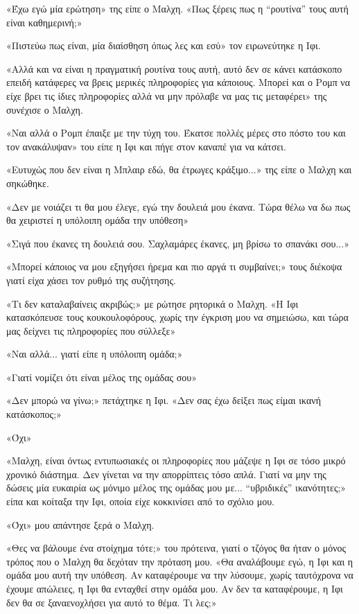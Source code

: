 \documentclass[12pt,twoside, openany]{book}
\begin{document}
«Έχω εγώ μία ερώτηση» της είπε ο Μαλχη. «Πως ξέρεις πως η “ρουτίνα” τους αυτή είναι καθημερινή;»

«Πιστεύω πως είναι, μία διαίσθηση όπως λες και εσύ» τον ειρωνεύτηκε η Ιφι.

«Αλλά και να είναι η πραγματική ρουτίνα τους αυτή, αυτό δεν σε κάνει κατάσκοπο επειδή κατάφερες να βρεις μερικές πληροφορίες για κάποιους. Μπορεί και ο Ρομπ να είχε βρει τις ίδιες πληροφορίες αλλά να μην πρόλαβε να μας τις μεταφέρει» της συνέχισε ο Μαλχη.

«Ναι αλλά ο Ρομπ έπαιξε με την τύχη του. Έκατσε πολλές μέρες στο πόστο του και τον ανακάλυψαν» του είπε η Ιφι και πήγε στον καναπέ για να κάτσει.

«Ευτυχώς που δεν είναι η Μπλαιρ εδώ, θα έτρωγες κράξιμο...» της είπε ο Μαλχη και σηκώθηκε.

«Δεν με νοιάζει τι θα μου έλεγε, εγώ την δουλειά μου έκανα. Τώρα θέλω να δω πως θα χειριστεί η υπόλοιπη ομάδα την υπόθεση»

«Σιγά που έκανες τη δουλειά σου. Σαχλαμάρες έκανες, μη βρίσω το σπανάκι σου...»

«Μπορεί κάποιος να μου εξηγήσει ήρεμα και πιο αργά τι συμβαίνει;» τους διέκοψα γιατί είχα χάσει τον ρυθμό της συζήτησης.

«Τι δεν καταλαβαίνεις ακριβώς;» με ρώτησε ρητορικά ο Μαλχη. «Η Ιφι κατασκόπευσε τους κουκουλοφόρους, χωρίς την έγκριση μου να σημειώσω, και τώρα μας δείχνει τις πληροφορίες που σύλλεξε»

«Ναι αλλά... γιατί είπε η υπόλοιπη ομάδα;»

«Γιατί νομίζει ότι είναι μέλος της ομάδας σου»

«Δεν μπορώ να γίνω;» πετάχτηκε η Ιφι. «Δεν σας έχω δείξει πως είμαι ικανή κατάσκοπος;»

«Όχι»

«Μαλχη, είναι όντως εντυπωσιακές οι πληροφορίες που μάζεψε η Ιφι σε τόσο μικρό χρονικό διάστημα. Δεν γίνεται να την απορρίπτεις τόσο απλά. Γιατί να μην της δώσεις μία ευκαιρία ως μόνιμο μέλος της ομάδας μου με... “υβριδικές” ικανότητες;» είπα και κοίταξα την Ιφι, οποία είχε κοκκινίσει από το σχόλιο μου.

«Όχι» μου απάντησε ξερά ο Μαλχη.

«Θες να βάλουμε ένα στοίχημα τότε;» του πρότεινα, γιατί ο τζόγος θα ήταν ο μόνος τρόπος που ο Μαλχη θα δεχόταν την πρόταση μου. «Θα αναλάβουμε εγώ, η Ιφι και η ομάδα μου αυτή την υπόθεση. Αν καταφέρουμε να την λύσουμε, χωρίς ταυτόχρονα να έχουμε απώλειες, η Ιφι θα ενταχθεί στην ομάδα μου. Αν δεν τα καταφέρουμε, η Ιφι δεν θα σε ξαναενοχλήσει για αυτό το θέμα. Τι λες;»
\end{document}
